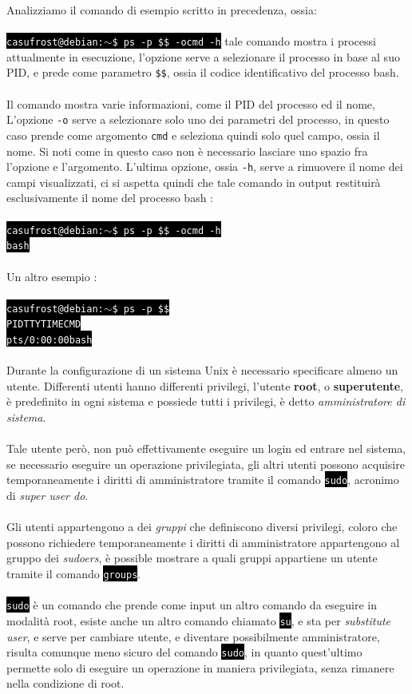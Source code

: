 \documentclass[12pt, letterpaper]{article}
\makeatletter
\newcommand{\code}[1]{\colorbox{light-gray}{\texttt{#1}}}
\newcommand{\shelll}[1]{\colorbox{black}{\textcolor{white}{\texttt{#1}}}}
\newcommand{\shell}[1]{\colorbox{black}{\textcolor{white}{\texttt{casufrost@debian:$\sim$\$ #1}}}}
\newcommand{\acc}{\\\hphantom{}\\}
\makeatother
\begin{document}
Analizziamo il comando di esempio scritto in precedenza, ossia: \acc\shell{ps -p \$\$ -ocmd -h} tale comando 
mostra i processi attualmente in esecuzione, l'opzione serve a selezionare il processo in base al suo 
PID, e prede come parametro \code{\$\$}, ossia il codice identificativo del processo bash. \acc Il comando mostra 
varie informazioni, come il PID del processo ed il nome, L'opzione \code{-o} serve a selezionare solo uno dei 
parametri del processo, in questo caso prende come argomento \code{cmd} e seleziona quindi solo quel campo, ossia 
il nome. Si noti come in questo caso non è necessario lasciare uno spazio fra l'opzione e l'argomento. L'ultima opzione, 
ossia \code{-h}, serve a rimuovere il nome dei campi visualizzati, ci si aspetta quindi che tale comando in output 
restituirà esclusivamente il nome del processo bash : \acc 
\shell{ps -p \$\$ -ocmd -h}\\
\shelll{bash}\acc 
Un altro esempio : \acc 
\shell{ps -p \$\$}\\
\shelll{\space\space PID\space\space TTY\space\space\space\space\space\space TIME\space\space\space CMD\space}\\
\shelll{\space pts/0\space\space{}:00:00\space bash}\acc 
Durante la configurazione di un sistema Unix è necessario specificare almeno un utente. Differenti utenti hanno 
differenti privilegi, l'utente \textbf{root}, o \textbf{superutente}, è predefinito in ogni sistema 
e possiede tutti i privilegi, è detto \textit{amministratore di sistema}.\acc 
Tale utente però, non può effettivamente eseguire un login ed entrare nel sistema, se necessario eseguire un 
operazione privilegiata, gli altri utenti possono acquisire temporaneamente i diritti di amministratore tramite 
il comando \shelll{sudo}, acronimo di \textit{super user do}.\acc 
Gli utenti appartengono a dei \textit{gruppi} che definiscono diversi privilegi, coloro che possono richiedere 
temporaneamente i diritti di amministratore appartengono al gruppo dei \textit{sudoers}, è possible mostrare 
a quali gruppi appartiene un utente tramite il comando \shelll{groups}.\acc 
\shelll{sudo} è un comando che prende come input un altro comando da eseguire in modalità root, esiste anche un altro 
comando chiamato \shelll{su}, e sta per \textit{substitute user}, e serve per cambiare utente, e diventare 
possibilmente amministratore, risulta comunque meno sicuro del comando \shelll{sudo}, in quanto quest'ultimo 
permette solo di eseguire un operazione in maniera privilegiata, senza rimanere nella condizione di root.
\end{document}
